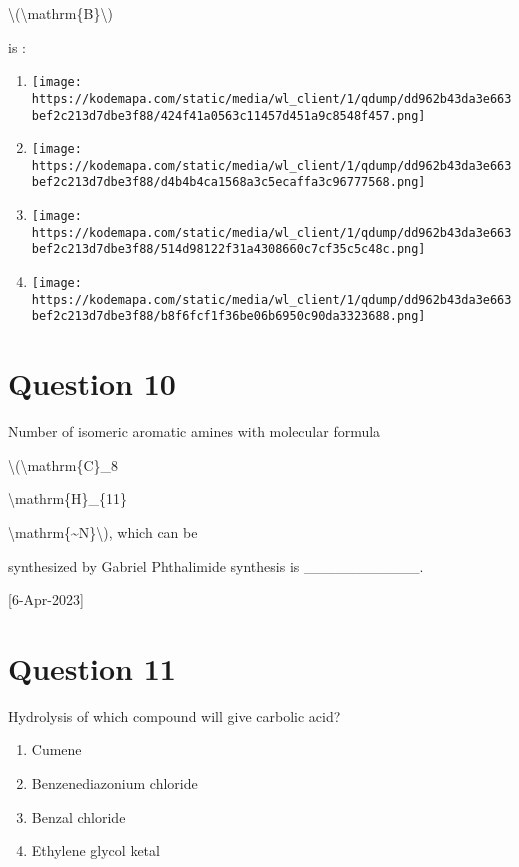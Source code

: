\documentclass{article}
\begin{document}
\textbackslash(\textbackslash mathrm\{B\}\textbackslash)

\textquotesingle{} is :


\begin{enumerate}[label=(\alph*)]
\item \texttt{[image: https://kodemapa.com/static/media/wl\_client/1/qdump/dd962b43da3e663bef2c213d7dbe3f88/424f41a0563c11457d451a9c8548f457.png]}


\item \texttt{[image: https://kodemapa.com/static/media/wl\_client/1/qdump/dd962b43da3e663bef2c213d7dbe3f88/d4b4b4ca1568a3c5ecaffa3c96777568.png]}


\item \texttt{[image: https://kodemapa.com/static/media/wl\_client/1/qdump/dd962b43da3e663bef2c213d7dbe3f88/514d98122f31a4308660c7cf35c5c48c.png]}


\item \texttt{[image: https://kodemapa.com/static/media/wl\_client/1/qdump/dd962b43da3e663bef2c213d7dbe3f88/b8f6fcf1f36be06b6950c90da3323688.png]}


\end{enumerate}
\newpage
\section*{Question 10}
Number of isomeric aromatic amines with molecular formula

\textbackslash(\textbackslash mathrm\{C\}\_8

\textbackslash mathrm\{H\}\_\{11\}

\textbackslash mathrm\{\textasciitilde N\}\textbackslash), which can be

synthesized by Gabriel Phthalimide synthesis is \_\_\_\_\_\_\_\_\_\_\_.~

{[}6-Apr-2023{]}


\begin{enumerate}[label=(\alph*)]
\end{enumerate}
\newpage
\section*{Question 11}
Hydrolysis of which compound will give carbolic acid?


\begin{enumerate}[label=(\alph*)]
\item Cumene


\item Benzenediazonium chloride


\item Benzal chloride


\item Ethylene glycol ketal


\end{enumerate}
\newpage
\end{document}
